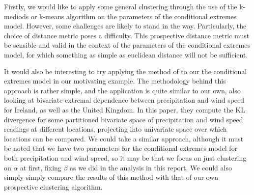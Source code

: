 \documentclass{article}
\numberwithin{equation}{section}
\begin{document}

Firstly, we would like to apply some general clustering through the use of the k-mediods or k-means algorithm on the parameters of the conditional extremes model. 
However, some challenges are likely to stand in the way. 
Particularly, the choice of distance metric poses a difficulty. 
This prospective distance metric must be sensible and valid in the context of the parameters of the conditional extremes model, for which something as simple as euclidean distance will not be sufficient.

It would also be interesting to try applying the method of \cite{Vignotto2021} to our the conditional extremes model in our motivating example. 
The methodology behind this approach is rather simple, and the application is quite similar to our own, also looking at bivariate extremal dependence between precipitation and wind speed for Ireland, as well as the United Kingdom.
In this paper, they compute the KL divergence for some partitioned bivariate space of precipitation and wind speed readings at different locations, projecting into univariate space over which locations can be compared. 
We could take a similar approach, although it must be noted that we have two parameters for the conditional extremes model for both precipitation and wind speed, so it may be that we focus on just clustering on $\alpha$ at first, fixing $\beta$ as we did in the analysis in this report. 
We could also simply simply compare the results of this method with that of our own prospective clustering algorithm.
\end{document}
